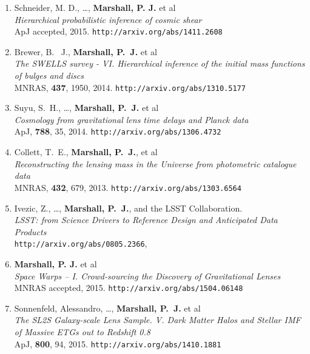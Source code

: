 \begin{enumerate}

\item{Schneider, M. D., \ldots, \textbf{Marshall, P. J.} et al\\
\textit{Hierarchical probabilistic inference of cosmic shear}\\
ApJ accepted, 2015.
\texttt{http://arxiv.org/abs/1411.2608}
}

\item{{Brewer}, B.~ J., \textbf{Marshall, P.~J.} et al\\
\textit{The SWELLS survey - VI. Hierarchical inference of the initial mass functions of bulges and discs}\\
MNRAS, \textbf{437}, 1950, 2014.
\texttt{http://arxiv.org/abs/1310.5177}
}

\item{{Suyu}, S.~H., \ldots, \textbf{{Marshall}, P.~J.} et al\\
\textit{Cosmology from gravitational lens time delays and Planck data}\\
ApJ, \textbf{788}, 35, 2014.
\texttt{http://arxiv.org/abs/1306.4732}
}

\item{Collett, T.~E., \textbf{Marshall, P.~J.}, et al\\
\textit{Reconstructing the lensing mass in the Universe from photometric catalogue data}\\
MNRAS, \textbf{432}, 679, 2013.
\texttt{http://arxiv.org/abs/1303.6564}
}

\item{{Ivezic}, Z., \ldots, \textbf{{Marshall}, P.~J.}, and the LSST Collaboration.\\
\textit{LSST: from Science Drivers to Reference Design and Anticipated Data Products}\\
\texttt{http://arxiv.org/abs/0805.2366},
}


\item{\textbf{Marshall, P. J.} et al\\
\textit{Space Warps -- I. Crowd-sourcing the Discovery of Gravitational Lenses}\\
MNRAS accepted, 2015.
\texttt{http://arxiv.org/abs/1504.06148}
}

\item{Sonnenfeld, Alessandro, \ldots, \textbf{Marshall, P.~J.} et al\\
\textit{The SL2S Galaxy-scale Lens Sample. V. Dark Matter Halos and Stellar IMF of Massive ETGs out to Redshift 0.8}\\
ApJ, \textbf{800}, 94, 2015.
\texttt{http://arxiv.org/abs/1410.1881}
}


\end{enumerate}
